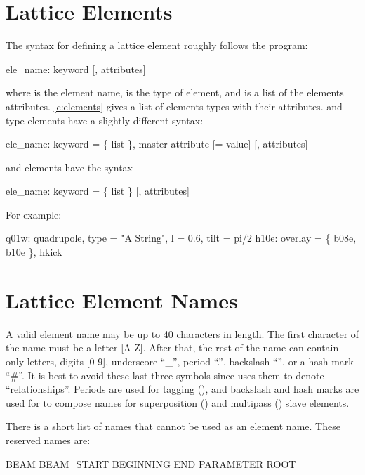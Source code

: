 \section{Lattice Elements}

The syntax for defining a lattice element roughly follows the
\mad\cite{b:maduser} program:
\begin{example}
  ele_name: keyword [, attributes]
\end{example}
where  is the element name,  is the type of
element, and  is a list of the elements
attributes. \cref{c:elements} gives a list of elements types with
their attributes.
 and  type elements have a slightly different syntax:
\begin{example}
  ele_name: keyword = \{ list \}, master-attribute [= value] [, attributes]
\end{example}
and  elements have the syntax
\begin{example}
  ele_name: keyword = \{ list \} [, attributes]
\end{example}  
For example:
\begin{example}
  q01w: quadrupole, type = "A String", l = 0.6, tilt = pi/2
  h10e: overlay = \{ b08e, b10e \}, hkick
\end{example}


\section{Lattice Element Names}
\label{s:ele.names}

A valid element name may be up to 40 characters in length. The first
character of the name must be a letter [A-Z]. After that, the rest of
the name can contain only letters, digits [0-9], underscore ``_'',
period ``.'', backslash ``\B'', or a hash mark ``\#''. It is best to
avoid these last three symbols since \bmad uses them to denote
``relationships''.  Periods are used for tagging (), and
backslash and hash marks are used for to compose names for
superposition () and multipass ()
slave elements.

There is a short list of names that cannot be used as an element name. 
These reserved names are:
\begin{example}
  BEAM
  BEAM_START
  BEGINNING
  END
  PARAMETER
  ROOT
\end{example}

